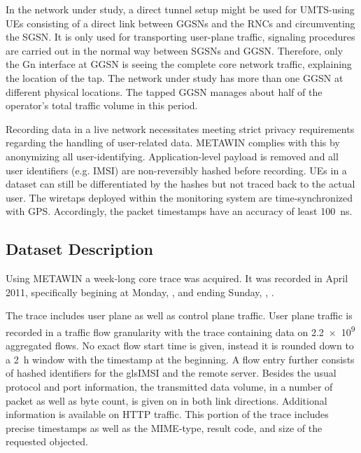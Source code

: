 In the network under study, a direct tunnel setup might be used for \gls{UMTS}-using \glspl{UE} consisting of a direct link between \glspl{GGSN} and the \glspl{RNC} and circumventing the \gls{SGSN}. It is only used for transporting user-plane traffic, signaling procedures are carried out in the normal way between \glspl{SGSN} and \gls{GGSN}. Therefore, only the Gn interface at \gls{GGSN} is seeing the complete core network traffic, explaining the location of the tap. The network under study has more than one \gls{GGSN} at different physical locations. The tapped \gls{GGSN} manages about half of the operator's total traffic volume in this period. 

Recording data in a live network necessitates meeting strict privacy requirements regarding the handling of user-related data. \gls{METAWIN} complies with this by anonymizing all user-identifying. Application-level payload is removed and all user identifiers (e.g. \gls{IMSI}) are non-reversibly hashed before recording. \glspl{UE} in a dataset can still be differentiated by the hashes but not traced back to the actual user. The wiretaps deployed within the monitoring system are time-synchronized with \gls{GPS}. Accordingly, the packet timestamps have an accuracy of least \SI{100}{\nano\second}.


\subsection{Dataset Description}

Using \gls{METAWIN} a week-long core trace was acquired. It was recorded in April 2011, specifically begining at Monday, \yyyymmdddate{},  and ending Sunday, , .

The trace includes user plane as well as control plane traffic. User plane traffic is recorded in a traffic flow granularity with the trace containing data on \num{2.2e9} aggregated flows. No exact flow start time is given, instead it is rounded down to a \SI{2}{\hour} window with the timestamp at the beginning. A flow entry further consists of hashed identifiers for the gls{IMSI} and the remote server. Besides the usual protocol and port information, the transmitted data volume, in a number of packet as well as byte count, is given on in both link directions. Additional information is available on \gls{HTTP} traffic. This portion of the trace includes precise timestamps as well as the \acrshort{MIME}-type, result code, and size of the requested objected.


